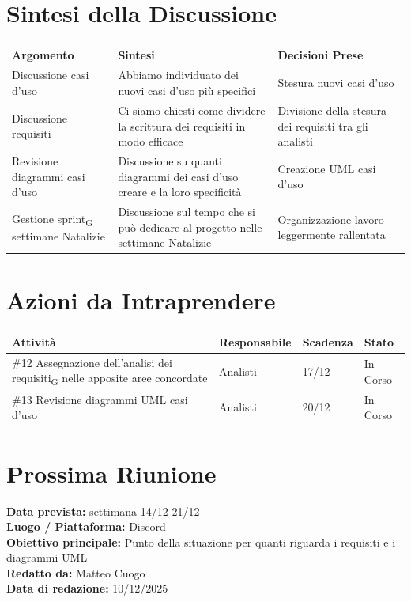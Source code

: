 \documentclass[a4paper,12pt]{article}
\newcommand{\gls}[1]{#1\textsubscript{G}}
\begin{document}
\section*{ Sintesi della Discussione}

\begin{longtable}{|p{}|p{}|p{}|}
\hline
\textbf{Argomento} & \textbf{Sintesi} & \textbf{Decisioni Prese} \\ \hline
 Discussione casi d'uso&Abbiamo individuato dei nuovi casi d'uso più specifici& Stesura nuovi casi d'uso   \\ \hline

 Discussione requisiti&Ci siamo chiesti come dividere la scrittura dei requisiti in modo efficace&Divisione della stesura dei requisiti tra gli analisti\\ \hline

Revisione diagrammi casi d'uso& Discussione su quanti diagrammi dei casi d'uso creare e la loro specificità&Creazione UML casi d'uso \\ \hline

Gestione \gls{sprint} settimane Natalizie& Discussione sul tempo che si può dedicare al progetto nelle settimane Natalizie& Organizzazione lavoro leggermente rallentata \\ \hline

\end{longtable}

\clearpage
\section*{ Azioni da Intraprendere}

\begin{longtable}{|p{}|p{}|p{}|p{}|}
\hline
\textbf{Attività} & \textbf{Responsabile} & \textbf{Scadenza} & \textbf{Stato} \\ \hline
\#12 Assegnazione dell'\gls{analisi dei requisiti} nelle apposite aree concordate& Analisti  &17/12  &In Corso  \\ \hline
\#13 Revisione diagrammi UML casi d'uso& Analisti  &20/12  &In Corso  \\ \hline

\end{longtable}


\section*{ Prossima Riunione}
\textbf{Data prevista:} settimana 14/12-21/12  \\
\textbf{Luogo / Piattaforma:} Discord \\
\textbf{Obiettivo principale:} Punto della situazione per quanti riguarda i requisiti e i diagrammi UML\\


\textbf{Redatto da:} Matteo Cuogo \\
\textbf{Data di redazione:} 10/12/2025
\end{document}
